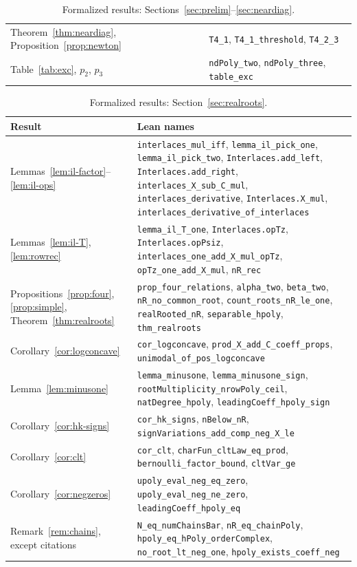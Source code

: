 \documentclass[11pt]{amsart}
\theoremstyle{definition}
\newcommand{\lean}[1]{\texttt{#1}}
\begin{document}
\begin{table}[t]
\begin{tabular}{l>{\raggedright\arraybackslash}p{}}
Theorem~\ref{thm:neardiag}, Proposition~\ref{prop:newton} & \lean{T4\_1}, \lean{T4\_1\_threshold}, \lean{T4\_2\_3}\\
Table~\ref{tab:exc}, $p_2$, $p_3$ & \lean{ndPoly\_two}, \lean{ndPoly\_three}, \lean{table\_exc}\\
\bottomrule
\end{tabular}
\caption{Formalized results: Sections~\ref{sec:prelim}--\ref{sec:neardiag}.}\label{tab:lean}
\end{table}

\begin{table}[t]
\centering
\footnotesize
\renewcommand{\arraystretch}{0.90}
\begin{tabular}{l>{\raggedright\arraybackslash}p{}}
\toprule
Result & Lean names\\
\midrule
Lemmas~\ref{lem:il-factor}--\ref{lem:il-ops} & \lean{interlaces\_mul\_iff}, \lean{lemma\_il\_pick\_one}, \lean{lemma\_il\_pick\_two}, \lean{Interlaces.add\_left}, \lean{Interlaces.add\_right}, \lean{interlaces\_X\_sub\_C\_mul}, \lean{interlaces\_derivative}, \lean{Interlaces.X\_mul}, \lean{interlaces\_derivative\_of\_interlaces}\\
Lemmas~\ref{lem:il-T}, \ref{lem:rowrec} & \lean{lemma\_il\_T\_one}, \lean{Interlaces.opTz}, \lean{Interlaces.opPsiz}, \lean{interlaces\_one\_add\_X\_mul\_opTz}, \lean{opTz\_one\_add\_X\_mul}, \lean{nR\_rec}\\
Propositions~\ref{prop:four}, \ref{prop:simple}, Theorem~\ref{thm:realroots} & \lean{prop\_four\_relations}, \lean{alpha\_two}, \lean{beta\_two}, \lean{nR\_no\_common\_root}, \lean{count\_roots\_nR\_le\_one}, \lean{realRooted\_nR}, \lean{separable\_hpoly}, \lean{thm\_realroots}\\
Corollary~\ref{cor:logconcave} & \lean{cor\_logconcave}, \lean{prod\_X\_add\_C\_coeff\_props}, \lean{unimodal\_of\_pos\_logconcave}\\
Lemma~\ref{lem:minusone} & \lean{lemma\_minusone}, \lean{lemma\_minusone\_sign}, \lean{rootMultiplicity\_nrowPoly\_ceil}, \lean{natDegree\_hpoly}, \lean{leadingCoeff\_hpoly\_sign}\\
Corollary~\ref{cor:hk-signs} & \lean{cor\_hk\_signs}, \lean{nBelow\_nR}, \lean{signVariations\_add\_comp\_neg\_X\_le}\\
Corollary~\ref{cor:clt} & \lean{cor\_clt}, \lean{charFun\_cltLaw\_eq\_prod}, \lean{bernoulli\_factor\_bound}, \lean{cltVar\_ge}\\
Corollary~\ref{cor:negzeros} & \lean{upoly\_eval\_neg\_eq\_zero}, \lean{upoly\_eval\_neg\_ne\_zero}, \lean{leadingCoeff\_hpoly\_eq}\\
Remark~\ref{rem:chains}, except citations & \lean{N\_eq\_numChainsBar}, \lean{nR\_eq\_chainPoly}, \lean{hpoly\_eq\_hPoly\_orderComplex}, \lean{no\_root\_lt\_neg\_one}, \lean{hpoly\_exists\_coeff\_neg}\\
\bottomrule
\end{tabular}
\caption{Formalized results: Section~\ref{sec:realroots}.}\label{tab:lean8}
\end{table}
\end{document}
